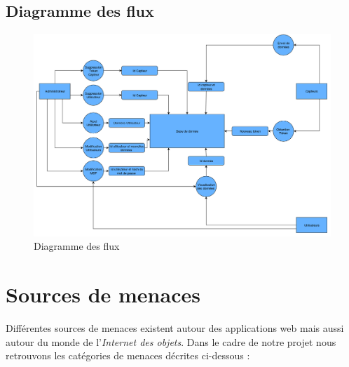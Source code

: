 \documentclass[12pt]{article}
\begin{document}
\subsection{Diagramme des flux}
\label{ssec:diagramme}

\begin{figure}[h!]
\centering
\includegraphics[angle=90, width=.85\textwidth]{diagramme_flux}
\caption{Diagramme des flux}
\end{figure}

\clearpage
\section{Sources de menaces}

Différentes sources de menaces existent autour des applications web mais aussi autour du monde de l'\emph{Internet des objets}. Dans le cadre de notre projet nous retrouvons les catégories de menaces décrites ci-dessous :
\end{document}
